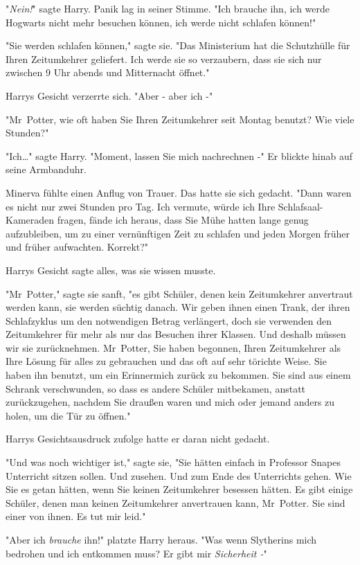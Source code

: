 {"\emph{Nein!}" sagte Harry. Panik lag in seiner Stimme. "Ich brauche ihn, ich werde Hogwarts nicht mehr besuchen können, ich werde nicht schlafen können!"

"Sie werden schlafen können," sagte sie. "Das Ministerium hat die Schutzhülle für Ihren Zeitumkehrer geliefert. Ich werde sie so verzaubern, dass sie sich nur zwischen 9 Uhr abends und Mitternacht öffnet."

Harrys Gesicht verzerrte sich. "Aber - aber ich -"

"Mr~Potter, wie oft haben Sie Ihren Zeitumkehrer seit Montag benutzt? Wie viele Stunden?"

"Ich…" sagte Harry. "Moment, lassen Sie mich nachrechnen -" Er blickte hinab auf seine Armbanduhr.

Minerva fühlte einen Anflug von Trauer. Das hatte sie sich gedacht. "Dann waren es nicht nur zwei Stunden pro Tag. Ich vermute, würde ich Ihre Schlafsaal-Kameraden fragen, fände ich heraus, dass Sie Mühe hatten lange genug aufzubleiben, um zu einer vernünftigen Zeit zu schlafen und jeden Morgen früher und früher aufwachten. Korrekt?"

Harrys Gesicht sagte alles, was sie wissen musste.

"Mr~Potter," sagte sie sanft, "es gibt Schüler, denen kein Zeitumkehrer anvertraut werden kann, sie werden süchtig danach. Wir geben ihnen einen Trank, der ihren Schlafzyklus um den notwendigen Betrag verlängert, doch sie verwenden den Zeitumkehrer für mehr als nur das Besuchen ihrer Klassen. Und deshalb müssen wir sie zurücknehmen. Mr~Potter, Sie haben begonnen, Ihren Zeitumkehrer als Ihre Lösung für alles zu gebrauchen und das oft auf sehr törichte Weise. Sie haben ihn benutzt, um ein Erinnermich zurück zu bekommen. Sie sind aus einem Schrank verschwunden, so dass es andere Schüler mitbekamen, anstatt zurückzugehen, nachdem Sie draußen waren und mich oder jemand anders zu holen, um die Tür zu öffnen."

Harrys Gesichtsausdruck zufolge hatte er daran nicht gedacht.

"Und was noch wichtiger ist," sagte sie, "Sie hätten einfach in Professor Snapes Unterricht sitzen sollen. Und zusehen. Und zum Ende des Unterrichts gehen. Wie Sie es getan hätten, wenn Sie keinen Zeitumkehrer besessen hätten. Es gibt einige Schüler, denen man keinen Zeitumkehrer anvertrauen kann, Mr~Potter. Sie sind einer von ihnen. Es tut mir leid."

"Aber ich \emph{brauche} ihn!" platzte Harry heraus. "Was wenn Slytherins mich bedrohen und ich entkommen muss? Er gibt mir \emph{Sicherheit -}"

}
